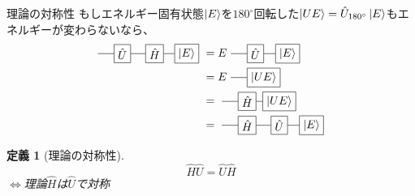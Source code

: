 \documentclass[dvipdfm]{beamer}
\newtheorem*{defn}{定義}
\begin{document}
\begin{frame}{理論の対称性}
    もしエネルギー固有状態$\ket{E}$を$180^\circ$回転した$\ket{UE}=\hat{U}_{180^\circ}\ket{E}$もエネルギーが変わらないなら、
    \begin{equation*}
        \begin{split}
            \vcenter{\hbox{
                \begin{tikzpicture}
                    \node at(0,0)[draw,rectangle](U){$\hat{U}$};
                    \node at(1,0)[draw,rectangle](H){$\hat{H}$};
                    \node at(2,0)[draw,rectangle](E){$\ket{E}$};
                    \draw(U.west)--++(-.5,0)(U.east)--(H.west)(H.east)--(E.west);
                \end{tikzpicture}
            }}
            &=
            E
            \vcenter{\hbox{
                \begin{tikzpicture}
                    \node at(0,0)[draw,rectangle](U){$\hat{U}$};
                    \node at(1,0)[draw,rectangle](E){$\ket{E}$};
                    \draw(U.west)--++(-.5,0)(U.east)--(E.west);
                \end{tikzpicture}
            }}
            \\
            &=
            E
            \vcenter{\hbox{
                \begin{tikzpicture}
                    \node at(0,0)[draw,rectangle](U){$\ket{UE}$};
                    \draw(U.west)--++(-.5,0);
                \end{tikzpicture}
            }}
            \\
            &=
            \vcenter{\hbox{
                \begin{tikzpicture}
                    \node at(0,0)[draw,rectangle](U){$\ket{UE}$};
                    \node at(-1,0)[draw,rectangle](H){$\hat{H}$};
                    \draw(H.west)--++(-.5,0)(H.east)--(U.west);
                \end{tikzpicture}
            }}
            \\
            &=
            \vcenter{\hbox{
                \begin{tikzpicture}
                    \node at(0,0)[draw,rectangle](U){$\hat{H}$};
                    \node at(1,0)[draw,rectangle](H){$\hat{U}$};
                    \node at(2,0)[draw,rectangle](E){$\ket{E}$};
                    \draw(U.west)--++(-.5,0)(U.east)--(H.west)(H.east)--(E.west);
                \end{tikzpicture}
            }}
        \end{split}
    \end{equation*}
    \begin{defn}[理論の対称性]
        \begin{equation*}
            \hat{H}\hat{U}=\hat{U}\hat{H}
        \end{equation*}
        $\Longleftrightarrow$理論$\hat{H}$は$\hat{U}$で対称
    \end{defn}
\end{frame}
\end{document}
